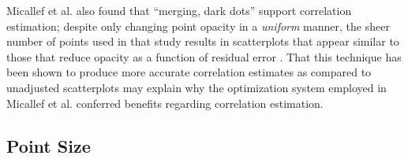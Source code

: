 \documentclass[manuscript, review, anonymous, screen]{acmart}
\begin{document}
Micallef et al. \citep{micallef_2017} also found that ``merging, dark
dots'' support correlation estimation; despite only changing point
opacity in a \emph{uniform} manner, the sheer number of points used in
that study results in scatterplots that appear similar to those that
reduce opacity as a function of residual error \citep{strain_2023}. That
this technique has been shown to produce more accurate correlation
estimates as compared to unadjusted scatterplots may explain why the
optimization system employed in Micallef et al. \citep{micallef_2017}
conferred benefits regarding correlation estimation.

\hypertarget{sec-point-size}{%
\subsection{Point Size}\label{sec-point-size}}
\end{document}
